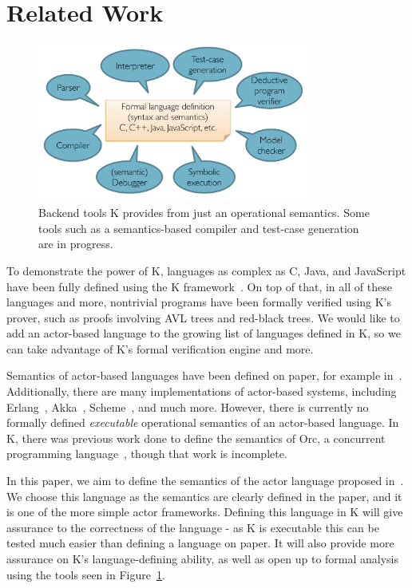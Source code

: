 \documentclass{llncs}
\begin{document}
\section{Related Work}

\begin{figure}
  \centering
  \includegraphics[width=0.8\textwidth]{../k-overview.png}
  \caption{Backend tools K provides from just an operational
           semantics. Some tools such as a semantics-based compiler and
           test-case generation are in progress.}
  \label{fig:k-tools}
\end{figure}
To demonstrate the power of K, languages as complex as C, Java, and JavaScript
have been fully defined using the K framework~\cite{kc,kjava,kjs}. On top of that, in
all of these languages and more, nontrivial programs have been formally verified
using K's prover, such as proofs involving AVL trees and red-black trees. We
would like to add an actor-based language to the growing list of languages
defined in K, so we can take advantage of K's formal verification engine and
more.

Semantics of actor-based languages have been defined on paper, for example
in~\cite{actor}. Additionally, there are many implementations of actor-based systems,
including Erlang~\cite{erlang}, Akka~\cite{akka}, Scheme~\cite{scheme}, and much more. However,
there is currently no formally defined \emph{executable} operational semantics
of an actor-based language. In K, there was previous work done to define the
semantics of Orc, a concurrent programming language~\cite{orc}, though that work is
incomplete.

In this paper, we aim to define the semantics of the actor language proposed
in~\cite{actor}.  We choose this language as the semantics are clearly defined in the
paper, and it is one of the more simple actor frameworks. Defining this language
in K will give assurance to the correctness of the language - as K is executable
this can be tested much easier than defining a language on paper. It will also
provide more assurance on K's language-defining ability, as well as open up to
formal analysis using the tools seen in Figure~\ref{fig:k-tools}.
\end{document}
